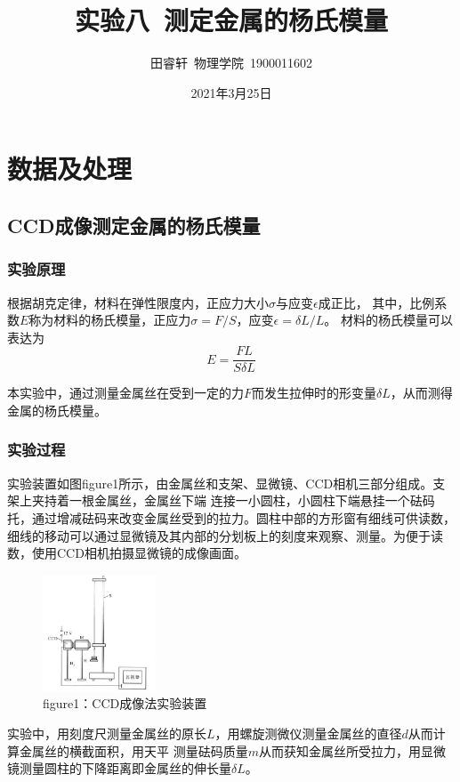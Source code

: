 \documentclass{article}
\title{\heiti 实验八\ 测定金属的杨氏模量}
\author{\kaishu 田睿轩\ 物理学院\ 1900011602}
\date{2021年3月25日}
\begin{document}
    \maketitle
    \section{数据及处理}
    \subsection{CCD成像测定金属的杨氏模量}
    \subsubsection{实验原理}
    根据胡克定律，材料在弹性限度内，正应力大小$\sigma$与应变$\epsilon$成正比，
    其中，比例系数$E$称为材料的杨氏模量，正应力$\sigma=F/S$，应变$\epsilon=\delta L/L$。
    材料的杨氏模量可以表达为
    $$E=\frac{FL}{S\delta L}$$

    本实验中，通过测量金属丝在受到一定的力$F$而发生拉伸时的形变量$\delta L$，从而测得金属的杨氏模量。
    \subsubsection{实验过程}
    实验装置如图figure1所示，由金属丝和支架、显微镜、CCD相机三部分组成。支架上夹持着一根金属丝，金属丝下端
    连接一小圆柱，小圆柱下端悬挂一个砝码托，通过增减砝码来改变金属丝受到的拉力。圆柱中部的方形窗有细线可供读数，
    细线的移动可以通过显微镜及其内部的分划板上的刻度来观察、测量。为便于读数，使用CCD相机拍摄显微镜的成像画面。

    \begin{figure}[htb]
        \centering
        \includegraphics[width=0.3\textwidth]{CCD实验装置.jpg}
        \caption{figure1：CCD成像法实验装置}
    \end{figure}

    实验中，用刻度尺测量金属丝的原长$L$，用螺旋测微仪测量金属丝的直径$d$从而计算金属丝的横截面积，用天平
    测量砝码质量$m$从而获知金属丝所受拉力，用显微镜测量圆柱的下降距离即金属丝的伸长量$\delta L$。
\end{document}
